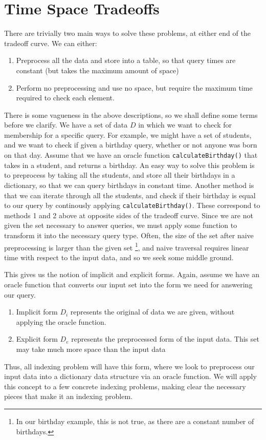 \documentclass{article}
\begin{document}
\section{Time Space Tradeoffs}
\label{sec:tradeoffs}
There are trivially two main ways to solve these problems, at either end of the tradeoff curve. We can either:
\begin{enumerate}
    \item Preprocess all the data and store into a table, so that query times are constant (but takes the maximum amount of space)
    \item Perform no preprocessing and use no space, but require the maximum time required to check each element.
\end{enumerate}
There is some vagueness in the above descriptions, so we shall define some terms before we clarify. We have a set of data $D$ in which we want to check for membership for a specific query. For example, we might have a set of students, and we want to check if given a birthday query, whether or not anyone was born on that day. Assume that we have an oracle function \texttt{calculateBirthday()} that takes in a student, and returns a birthday. An easy way to solve this problem is to preprocess by taking all the students, and store all their birthdays in a dictionary, so that we can query birthdays in constant time. Another method is that we can iterate through all the students, and check if their birthday is equal to our query by continously applying \texttt{calculateBirthday()}. These correspond to methods 1 and 2 above at opposite sides of the tradeoff curve. Since we are not given the set necessary to answer queries, we must apply some function to transform it into the necessary query type. Often, the size of the set after naive preprocessing is larger than the given set \footnote{In our birthday example, this is not true, as there are a constant number of birthdays.}, and naive traversal requires linear time with respect to the input data, and so we seek some middle ground. 

This gives us the notion of implicit and explicit forms. Again, assume we have an oracle function that converts our input set into the form we need for answering our query.
\begin{enumerate}
    \item Implicit form $D_i$ represents the original of data we are given, without applying the oracle function.
    \item Explicit form $D_e$ represents the preprocessed form of the input data. This set may take much more space than the input data
\end{enumerate}
Thus, all indexing problem will have this form, where we look to preprocess our input data into a dictionary data structure via an oracle function. We will apply this concept to a few concrete indexing problems, making clear the necessary pieces that make it an indexing problem.
\end{document}
